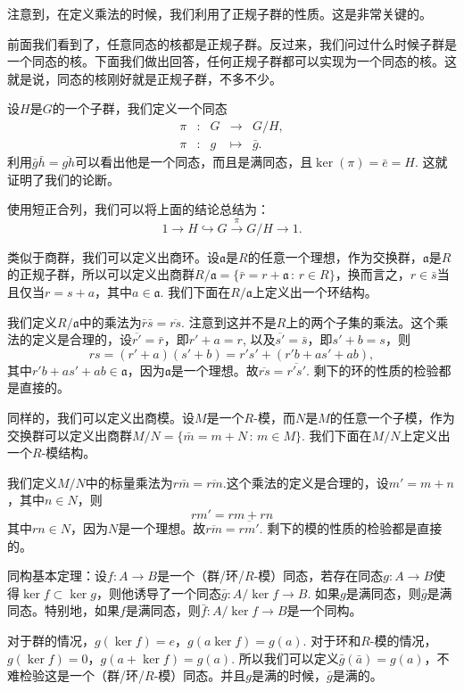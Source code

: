 注意到，在定义乘法的时候，我们利用了正规子群的性质。这是非常关键的。

\para 前面我们看到了，任意同态的核都是正规子群。反过来，我们问过什么时候子群是一个同态的核。下面我们做出回答，任何正规子群都可以实现为一个同态的核。这就是说，同态的核刚好就是正规子群，不多不少。

设$H$是$G$的一个子群，我们定义一个同态
\[
	\begin{array}{ccccc}
		\pi &:&G &\to& G/H,\\
		\pi &:&g &\mapsto& \bar{g}.
	\end{array}
\]
利用$\bar{g}\bar{h}=\overline{gh}$可以看出他是一个同态，而且是满同态，且$\ker(\pi)=\bar{e}=H$. 这就证明了我们的论断。

使用短正合列，我们可以将上面的结论总结为：
\[
	1\to H \hookrightarrow G \xrightarrow{\pi} G/H\to 1.
\]

\para 类似于商群，我们可以定义出商环。设$\mathfrak{a}$是$R$的任意一个理想，作为交换群，$\mathfrak{a}$是$R$的正规子群，所以可以定义出商群$R/\mathfrak{a}=\{\bar{r}=r+\mathfrak{a}\,:\, r\in R\}$，换而言之，$r\in \bar{s}$当且仅当$r=s+a$，其中$a\in \mathfrak{a}$. 我们下面在$R/\mathfrak{a}$上定义出一个环结构。

我们定义$R/\mathfrak{a}$中的乘法为$\bar{r}\bar{s}=\overline{rs}$. 注意到这并不是$R$上的两个子集的乘法。这个乘法的定义是合理的，设$\overline{r'}=\bar{r}$，即$r'+a=r$, 以及$\overline{s'}=\bar{s}$，即$s'+b =s$，则
\[
	rs=(r'+a)(s'+b)=r's'+(r'b+as'+ab),
\]
其中$r'b+as'+ab\in \mathfrak{a}$，因为$\mathfrak{a}$是一个理想。故$\overline{rs}=\overline{r's'}$. 剩下的环的性质的检验都是直接的。

\para 同样的，我们可以定义出商模。设$M$是一个$R$-模，而$N$是$M$的任意一个子模，作为交换群可以定义出商群$M/N=\{\bar{m}=m+N\,:\, m\in M\}$. 我们下面在$M/N$上定义出一个$R$-模结构。

我们定义$M/N$中的标量乘法为$r\bar{m}=\overline{rm}$.这个乘法的定义是合理的，设$m'=m+n$，其中$n\in N$，则
\[
	rm'=rm+rn
\]
其中$rn\in N$，因为$N$是一个理想。故$\overline{rm}=\overline{rm'}$. 剩下的模的性质的检验都是直接的。

\theo 同构基本定理：设$f:A\to B$是一个（群/环/$R$-模）同态，若存在同态$g: A\to B$使得$\ker f\subset \ker g$，则他诱导了一个同态$\bar{g}:A/\ker{f}\to B$. 如果$g$是满同态，则$\bar{g}$是满同态。特别地，如果$f$是满同态，则$\bar{f}: A/\ker{f}\to B$是一个同构。

\proof
	对于群的情况，$g(\ker f)=e$，$g(a\ker f)=g(a)$. 对于环和$R$-模的情况，$g(\ker f)=0$，$g(a+\ker f)=g(a)$. 所以我们可以定义$\bar{g}(\bar{a})=g(a)$，不难检验这是一个（群/环/$R$-模）同态。并且$g$是满的时候，$\bar{g}$是满的。

